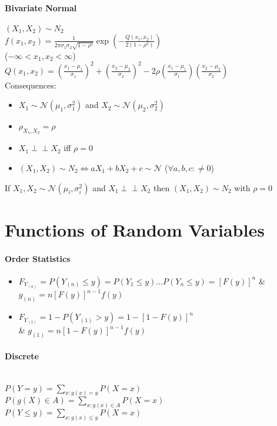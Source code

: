 \documentclass[paper=a4,fontsize=8pt,pagesize,DIV=calc]{scrartcl}
\newcounter{row}
\def\Perp{\perp\!\!\!\perp}
\begin{document}
\begin{multicols}{3}
\paragraph{Bivariate Normal} $(X_1,X_2) \sim N_2$\\
$f(x_1,x_2)=\frac{1}{2\pi \sigma_1 \sigma_2 \sqrt{1-\rho^2}}\exp\left(-\frac{Q(x_1,x_2)}{2(1-\rho^2)}\right)$ \\
($-\infty <x_1,x_2< \infty$)\\
$Q(x_1,x_2)=\left(\frac{x_1-\mu_1}{\sigma_1}\right)^2 +\left(\frac{x_2-\mu_2}{\sigma_2}\right)^2-2\rho\left(\frac{x_1-\mu_1}{\sigma_1}\right)\left(\frac{x_2-\mu_2}{\sigma_2}\right)$\\
Consequences:
\begin{itemize}
\item $X_1 \sim \mathcal{N}(\mu_1, \sigma_1^2)$ and $X_2 \sim \mathcal{N}(\mu_2, \sigma_2^2)$
\item $\rho_{X_1,X_2}=\rho$
\item $X_1 \Perp X_2$ iff $\rho=0$
\item $(X_1,X_2) \sim N_2 \Leftrightarrow aX_1+bX_2+c \sim \mathcal{N}$ ($\forall a,b,c : \neq 0$)
\end{itemize}
If $X_1,X_2 \sim \mathcal{N}(\mu_i, \sigma_i^2)$ and $X_1 \Perp X_2$ then $(X_1,X_2) \sim N_2$ with $\rho=0$

\section{Functions of Random Variables}
\paragraph{Order Statistics}
\begin{itemize}
\item $F_{Y_{(n)}}=P(Y_{(n)}\leq y)=P(Y_1\leq y)...P(Y_n\leq y)=[F(y)]^n$ \& $g_{(n)}=n[F(y)]^{n-1}f(y)$
\item $F_{Y_{(1)}}=1-P(Y_{(1)}> y)=1-[1-F(y)]^n$\\
\& $g_{(1)}=n[1-F(y)]^{n-1}f(y)$
\end{itemize}
\paragraph{Discrete} ~~\\ $P(Y=y)=\sum_{x:g(x)=y}P(X=x)$
\\ $P(g(X)\in A)=\sum_{x:g(x)\in A} P(X=x)$ \\
$P(Y\leq y)=\sum_{x:g(x)\leq y}P(X=x)$

\end{multicols}
\end{document}
